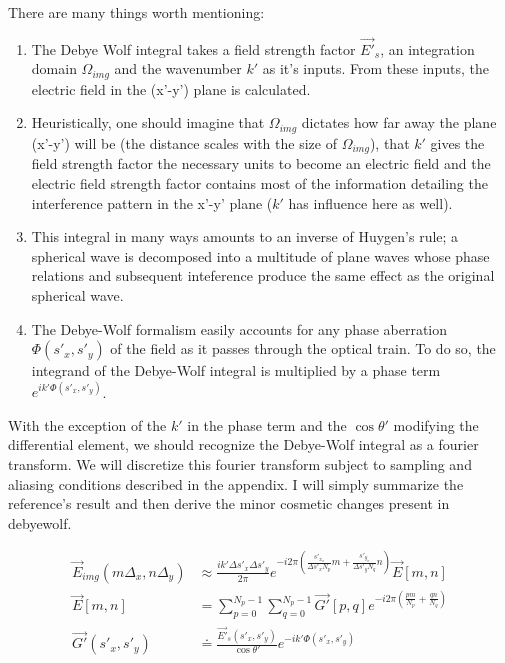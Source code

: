   There are many things worth mentioning:
  \begin{enumerate}
  \item The Debye Wolf integral takes a field strength factor $\vec{E'}_s$,
    an integration domain $\Omega_{img}$ and the wavenumber $k'$ as it's inputs.
    From these inputs, the electric field in the (x'-y') plane is
    calculated. 
  \item Heuristically, one should imagine that $\Omega_{img}$ dictates how far 
    away the plane (x'-y') will be (the distance scales with the size of 
    $\Omega_{img}$), that $k'$ gives the field strength factor the necessary 
    units to become an electric field and the electric field strength factor 
    contains most of the information detailing the interference pattern in the
    x'-y' plane ($k'$ has influence here as well).
  \item This integral in many ways amounts to
  an inverse of Huygen's rule; a spherical wave is decomposed into a multitude 
  of plane waves whose phase relations and subsequent inteference produce
  the same effect as the original spherical wave.
  \item The Debye-Wolf formalism easily accounts for any phase aberration 
    $\Phi(s'_x,s'_y)$ of the field as it passes through the optical train. To do so, the integrand
    of the Debye-Wolf integral is multiplied by a phase term $e^{ik'\Phi(s'_x,s'_y)}$.
  \end{enumerate}

  With the exception of the $k'$ in the phase term and the $\cos{\theta'}$ 
  modifying the differential element, we should recognize the
  Debye-Wolf integral as a fourier transform. We will discretize this
  fourier transform subject to sampling and aliasing conditions described
  in the appendix. I will simply summarize the reference's result and then
  derive the minor cosmetic changes present in debyewolf.

  \begin{equation*}
    \begin{split}
      \vec{E}_{img}( m \Delta_x, n \Delta_y) & \approx \frac{i k' \Delta s'_x \Delta s'_y}{2 \pi} e^{-i2\pi \left ( \frac{s'_{x_o}}{\Delta s'_x N_p} m + \frac{s'_{y_o}}{\Delta s'_yN_q} n \right ) } \vec{E}\left [ m, n \right ] \\
      \vec{E}\left [ m,n \right ] & = \sum_{p=0}^{N_p-1}\sum_{q=0}^{N_p-1}\vec{G'}\left [p,q\right ] e^{-i2\pi \left ( \frac{pm}{N_p}+\frac{qn}{N_q} \right ) } \\
      \vec{G'}(s'_x,s'_y) & \doteq \frac{\vec{E'}_s(s'_x,s'_y)}{\cos{\theta'}}e^{-ik'\Phi(s'_x,s'_y)}
    \end{split}
  \end{equation*}
  
